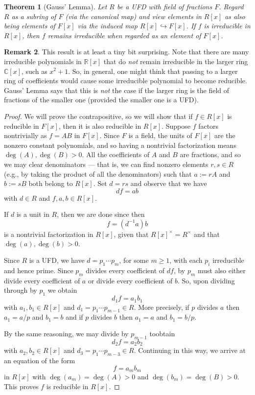 \documentclass[12pt]{report}
\newtheorem{theorem}{Theorem}[chapter]
\numberwithin{equation}{section}
\numberwithin{theorem}{chapter}
\theoremstyle{definition}
\newtheorem*{basic properties}{Basic Properties}
\newtheorem*{Important Remark}{Important Remark}
\newtheorem{remark}[theorem]{Remark}
\newcommand{\C}{\mathbb{C}}
\begin{document}
\begin{theorem}[Gauss' Lemma]
Let $R$ be a UFD with field of fractions $F$. Regard $R$ as a subring of $F$ (via the canonical map) and view elements in $R[x]$ as also being elements of $F[x]$ via the induced map $R[x]\hookrightarrow F[x]$.
If $f$ is irreducible in $R[x]$, then $f$ remains irreducible when regarded as an element of $F[x]$.
\end{theorem}


\begin{remark}
This result is at least a tiny bit surprising. Note that there are many irreducible polynomials in $\mathbb{R}[x]$  that do {\em not} remain irreducible in the larger ring $\C[x]$, such as $x^2 + 1$. So, in general, one might think that passing to a larger ring of coefficients would cause some irreducible polynomial to become reducible. Gauss' Lemma says that this is {\em not} the case if the larger ring is the field of fractions of the smaller one (provided the smaller one is a UFD). 
\end{remark}

\begin{proof}
We will prove the contrapositive, so we will show that if $f \in R[x]$ is reducible in $F[x]$, then it is also reducible in $R[x]$. Suppose $f$ factors nontrivially as $f = AB$ in $F[x]$.
Since $F$ is a field, the units of $F[x]$ are the nonzero constant polynomials, and so having a nontrivial factorization means $\deg(A), \deg(B) > 0$.
All the coefficients of $A$ and $B$ are fractions, and so we may clear denominators --- that is, we can find nonzero elements $r,s \in R$ (e.g., by taking the product of all the denominators) such that $a := r A$ and $b := s B$ both belong to $R[x]$.  Set $d = rs$ and observe that we have
$$d f = a b$$
with $d \in R$ and $f,a,b \in R[x]$. 
  

If $d$ is a unit in $R$, then we are done since then 
$$f = (d^{-1}a) b$$
is a nontrivial factorization in $R[x]$, given that $R[x]^\times = R^\times$ and that $\deg(a), \deg(b) > 0$.


Since $R$ is a UFD, we have $d = p_1 \cdots p_m$, for some $m \geqslant 1$, with each $p_i$ irreducible and hence prime.
Since $p_m$ divides every coefficient of $d f$, by  $p_m$ must also either divide every coefficient of $a$ or divide every coefficient of $b$.
So, upon dividing through by $p_1$ we obtain
$$d_1 f = a_1 b_1$$
with $a_1, b_1 \in R[x]$ and $d_1 = p_1 \cdots p_{m-1} \in R$. 
More precisely, if $p$ divides $a$ then $a_1 = a/p$ and $b_1 = b$ and if $p$ divides $b$ then $a_1 = a$ and $b_1 = b/p$.

By the same reasoning, we may divide by $p_{m-1}$ toobtain
$$d_2 f = a_2 b_2$$
with $a_2, b_2 \in R[x]$ and $d_3 = p_1 \cdots p_{m-3}  \in R$. 
Continuing in this way, we arrive at an equation of the form 
$$f = a_m b_m$$ 
in $R[x]$ with $\deg(a_m) = \deg(A) > 0$ and $\deg(b_m) = \deg(B) > 0$. This proves $f$ is reducible in $R[x]$. 
\end{proof}
\end{document}
